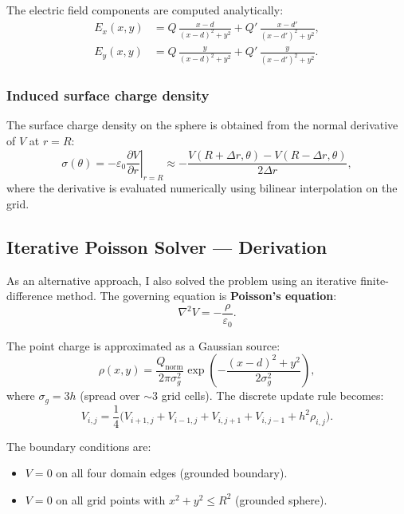 \documentclass[11pt,a4paper]{article}
\begin{document}
The electric field components are computed analytically:
\begin{align}
E_x(x,y) &= Q\,\frac{x-d}{(x-d)^2 + y^2} + Q'\,\frac{x-d'}{(x-d')^2 + y^2}, \\[4pt]
E_y(x,y) &= Q\,\frac{y}{(x-d)^2 + y^2} + Q'\,\frac{y}{(x-d')^2 + y^2}.
\end{align}

\subsubsection{Induced surface charge density}

The surface charge density on the sphere is obtained from the normal derivative of $V$ at $r=R$:
\begin{equation}
\sigma(\theta) = -\varepsilon_0 \left.\frac{\partial V}{\partial r}\right|_{r=R} \approx -\frac{V(R+\Delta r,\theta) - V(R-\Delta r,\theta)}{2\Delta r},
\label{eq:sigma}
\end{equation}
where the derivative is evaluated numerically using bilinear interpolation on the grid.

\subsection{Iterative Poisson Solver --- Derivation}

As an alternative approach, I also solved the problem using an iterative finite-difference method. The governing equation is \textbf{Poisson's equation}:
\begin{equation}
\nabla^2 V = -\frac{\rho}{\varepsilon_0}.
\end{equation}

The point charge is approximated as a Gaussian source:
\begin{equation}
\rho(x,y) = \frac{Q_{\text{norm}}}{2\pi\sigma_g^2}\exp\!\left(-\frac{(x-d)^2 + y^2}{2\sigma_g^2}\right),
\end{equation}
where $\sigma_g = 3h$ (spread over ${\sim}3$ grid cells). The discrete update rule becomes:
\begin{equation}
\boxed{\;V_{i,j} = \frac{1}{4}\bigl(V_{i+1,j} + V_{i-1,j} + V_{i,j+1} + V_{i,j-1} + h^2 \rho_{i,j}\bigr).\;}
\label{eq:poisson_update}
\end{equation}

The boundary conditions are:
\begin{itemize}[leftmargin=2em]
\item $V = 0$ on all four domain edges (grounded boundary).
\item $V = 0$ on all grid points with $x^2 + y^2 \le R^2$ (grounded sphere).
\end{itemize}
\end{document}
